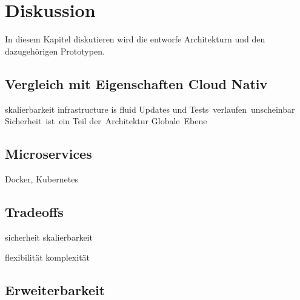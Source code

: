 \chapter{Diskussion}
In diesem Kapitel diskutieren wird die entworfe Architekturn und den dazugehörigen Prototypen.


\section{Vergleich mit Eigenschaften Cloud Nativ}
skalierbarkeit
infrastructure is fluid
Updates und Tests verlaufen unscheinbar
Sicherheit ist ein Teil der Architektur
Globale Ebene

\section{Microservices}
 Docker, Kubernetes
 
\section{Tradeoffs}
sicherheit skalierbarkeit

flexibilität komplexität

\section{Erweiterbarkeit}